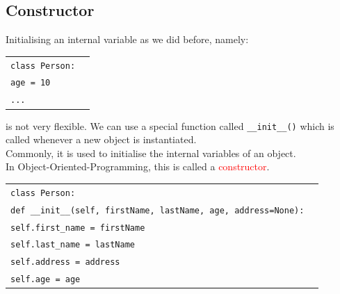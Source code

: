 \documentclass[t,handout,9pt]{beamer}
\begin{document}
\subsection{Constructor}
\begin{frame}
\vfill
Initialising an internal variable as we did before, namely:
\begin{table}[]
\begin{flushleft}
\begin{tabular}{ll}
\texttt{class Person:} &  \\
\texttt{\qquad age = 10} &  \\
\texttt{\qquad ...} &  \\
\end{tabular}
\end{flushleft}
\end{table}
is not very flexible.
\vfill
We can use a special function called \texttt{\_\_init\_\_()} which is called whenever a new object is instantiated.\\
Commonly, it is used to initialise the internal variables of an object.\\
In Object-Oriented-Programming, this is called a \textcolor{red}{constructor}.
\begin{table}[]
\begin{flushleft}
\begin{tabular}{ll}
\texttt{class Person:} &  \\
\texttt{\qquad def \_\_init\_\_(self, firstName, lastName, age, address=None):} &  \\
\texttt{\qquad\qquad self.first\_name = firstName} &  \\
\texttt{\qquad\qquad self.last\_name = lastName} &  \\
\texttt{\qquad\qquad self.address = address} &  \\
\texttt{\qquad\qquad self.age = age} &  \\
\end{tabular}
\end{flushleft}
\end{table}
\vfill
\end{frame}
%
\end{document}
